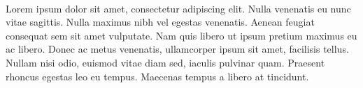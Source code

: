 \documentclass[../main.tex]{subfiles}
\begin{document}
\paragraph{}
Lorem ipsum dolor sit amet, consectetur adipiscing elit. Nulla venenatis eu nunc vitae sagittis. Nulla maximus nibh vel egestas venenatis. Aenean feugiat consequat sem sit amet vulputate. Nam quis libero ut ipsum pretium maximus eu ac libero. Donec ac metus venenatis, ullamcorper ipsum sit amet, facilisis tellus. Nullam nisi odio, euismod vitae diam sed, iaculis pulvinar quam. Praesent rhoncus egestas leo eu tempus. Maecenas tempus a libero at tincidunt.
\end{document}
